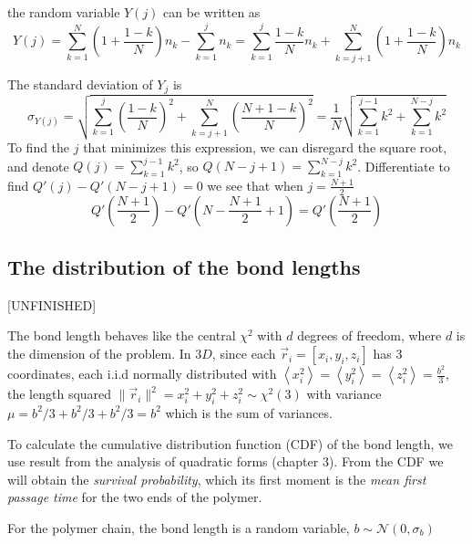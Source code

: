 \documentclass{report}
\begin{document}
the random variable $Y(j)$ can be written as
\begin{equation*}
Y(j) = \sum_{k=1}^{N}\left(1+\frac{1-k}{N}\right)n_k -\sum_{k=1}^{j}n_k = \sum_{k=1}^{j}\frac{1-k}{N}n_k +\sum_{k=j+1}^{N}(1+\frac{1-k}{N})n_k
\end{equation*}

The standard deviation of $Y_j$ is
\begin{equation*}
\sigma_{Y(j)}=\sqrt{\sum_{k=1}^{j}\left(\frac{1-k}{N}\right)^2+\sum_{k=j+1}^{N}\left(\frac{N+1-k}{N} \right)^2}=\frac{1}{N}\sqrt{\sum_{k=1}^{j-1}k^2+\sum_{k=1}^{N-j}k^2}
\end{equation*}
To find the $j$ that minimizes this expression, we can disregard the square root, and denote $Q(j)=\sum_{k=1}^{j-1}k^2$, so $Q(N-j+1)=\sum_{k=1}^{N-j}k^2$. Differentiate to find $Q'(j)-Q'(N-j+1)=0$  we see that when $j= \frac{N+1}{2}$\\
\begin{equation*}
Q'(\frac{N+1}{2})-Q'(N-\frac{N+1}{2}+1)=Q'(\frac{N+1}{2})
\end{equation*} 




\subsection{The distribution of the bond lengths}\label{subsection_distributionOfTheBondLength}
[UNFINISHED] 

The bond length behaves like the central $\chi ^2$ with $d$ degrees of freedom, where $d$ is the dimension of the problem. 
In $3D$, since each $\vec{r}_i=[x_i,y_i,z_i]$ has 3 coordinates, each i.i.d normally distributed with $\left<x_i^2\right>=\left<y_i^2\right>=\left<z_i^2\right>=\frac{b^2}{3}$, the length squared $\|\vec{r}_i\|^2=x_i^2+y_i^2+z_i^2\sim\chi^2(3)$ 
with variance $\mu=b^2/3+b^2/3+b^2/3=b^2$ which is the sum of variances.

To calculate the cumulative distribution function (CDF) of the bond length, we use result from the analysis of quadratic forms \cite{mathai1992quadratic} (chapter 3). From the CDF we will obtain the \textit{survival probability}, which its first moment is the \textit{mean first passage time} for the two ends of the polymer.

For the polymer chain, the bond length is a random variable, $b\sim \mathcal{N}(0,\sigma_b)$
\end{document}
